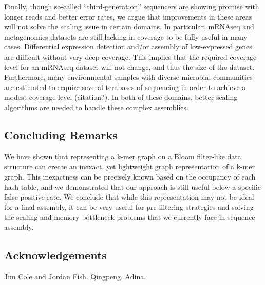 \documentclass[12pt]{article} \usepackage{simplemargins}
\begin{document}
Finally, though so-called ``third-generation'' sequencers are showing promise with 
longer reads and better error rates, we argue that improvements in these 
areas will not solve the scaling issue in certain domains. In particular, 
mRNAseq and metagenomics datasets are still lacking in coverage to be 
fully useful in many cases. Differential expression detection and/or assembly 
of low-expressed genes are difficult without very deep coverage. This implies 
that the required coverage level for an mRNAseq dataset will not change, 
and thus the size of the dataset. Furthermore, many environmental samples with 
diverse microbial communities are estimated to require several terabases of sequencing 
in order to achieve a modest coverage level (citation?). In both of these domains, better 
scaling algorithms are needed to handle these complex assemblies. 

\subsection{Concluding Remarks}
We have shown that representing a k-mer graph on a Bloom filter-like data 
structure can create an inexact, yet lightweight graph representation of 
a k-mer graph. This inexactness can be precisely known based on the occupancy 
of each hash table, and we demonstrated that our approach is still useful 
below a specific false positive rate. We conclude that while this representation 
may not be ideal for a final assembly, it can be very useful for pre-filtering 
strategies and solving the scaling and memory bottleneck problems that we 
currently face in sequence assembly.

\subsection{Acknowledgements}

Jim Cole and Jordan Fish.  Qingpeng.  Adina.



\end{document}
